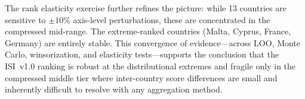 The rank elasticity exercise further refines the picture: while 13
countries are sensitive to $\pm 10\%$ axis-level perturbations, these
are concentrated in the compressed mid-range.  The extreme-ranked
countries (Malta, Cyprus, France, Germany) are entirely stable.  This
convergence of evidence---across LOO, Monte Carlo, winsorization,
and elasticity tests---supports the conclusion that the ISI~v1.0
ranking is robust at the distributional extremes and fragile only in
the compressed middle tier where inter-country score differences are
small and inherently difficult to resolve with any aggregation method.
